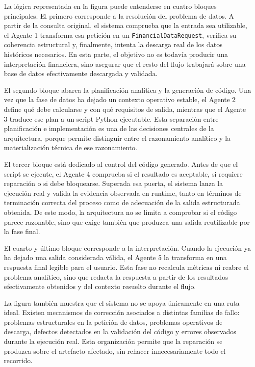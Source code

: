 La l\'ogica representada en la figura puede entenderse en cuatro bloques principales. El primero corresponde a la resoluci\'on del problema de datos. A
partir de la consulta original, el sistema comprueba que la entrada sea utilizable, el Agente 1 transforma esa petici\'on en un \texttt{FinancialDataRequest},
verifica su coherencia estructural y, finalmente, intenta la descarga real de los datos hist\'oricos necesarios. En esta parte, el objetivo no es todav\'ia
producir una interpretaci\'on financiera, sino asegurar que el resto del flujo trabajar\'a sobre una base de datos efectivamente descargada y validada.

El segundo bloque abarca la planificaci\'on anal\'itica y la generaci\'on de c\'odigo. Una vez que la fase de datos ha dejado un contexto operativo estable,
el Agente 2 define qu\'e debe calcularse y con qu\'e requisitos de salida, mientras que el Agente 3 traduce ese plan a un script Python ejecutable. Esta
separaci\'on entre planificaci\'on e implementaci\'on es una de las decisiones centrales de la arquitectura, porque permite distinguir entre el razonamiento
anal\'itico y la materializaci\'on t\'ecnica de ese razonamiento.

El tercer bloque est\'a dedicado al control del c\'odigo generado. Antes de que el script se ejecute, el Agente 4 comprueba si el resultado es aceptable, si
requiere reparaci\'on o si debe bloquearse. Superada esa puerta, el sistema lanza la ejecuci\'on real y valida la evidencia observada en runtime, tanto en
t\'erminos de terminaci\'on correcta del proceso como de adecuaci\'on de la salida estructurada obtenida. De este modo, la arquitectura no se limita a
comprobar si el c\'odigo parece razonable, sino que exige tambi\'en que produzca una salida reutilizable por la fase final.

El cuarto y \'ultimo bloque corresponde a la interpretaci\'on. Cuando la ejecuci\'on ya ha dejado una salida considerada v\'alida, el Agente 5 la
transforma en una respuesta final legible para el usuario. Esta fase no recalcula m\'etricas ni reabre el problema anal\'itico, sino que redacta la
respuesta a partir de los resultados efectivamente obtenidos y del contexto resuelto durante el flujo.

La figura tambi\'en muestra que el sistema no se apoya \'unicamente en una ruta ideal. Existen mecanismos de correcci\'on asociados a distintas familias de
fallo: problemas estructurales en la petici\'on de datos, problemas operativos de descarga, defectos detectados en la validaci\'on del c\'odigo y errores
observados durante la ejecuci\'on real. Esta organizaci\'on permite que la reparaci\'on se produzca sobre el artefacto afectado, sin rehacer
innecesariamente todo el recorrido.

